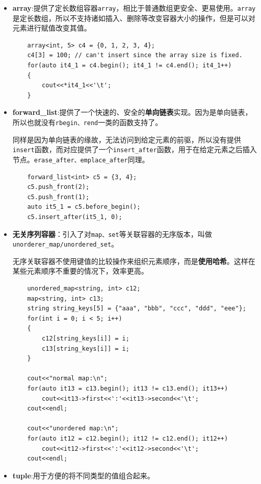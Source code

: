 \documentclass[UTF8,a4paper,12pt]{ctexbook} %
\begin{document}
					\begin{itemize}
						\item \textbf{array}:提供了定长数组容器\verb|array|，相比于普通数组更安全、更易使用。\verb|array|是定长数组，所以不支持诸如插入、删除等改变容器大小的操作，但是可以对元素进行赋值改变其值。
						\begin{lstlisting}
	array<int, 5> c4 = {0, 1, 2, 3, 4};
	c4[3] = 100; // can't insert since the array size is fixed.
	for(auto it4_1 = c4.begin(); it4_1 != c4.end(); it4_1++)
	{
		cout<<*it4_1<<'\t';
	}
						\end{lstlisting}
						
						\item \textbf{forward\_list}:提供了一个快速的、安全的\textbf{单向链表}实现。因为是单向链表，所以也就没有\verb|rbegin、rend|一类的函数支持了。
			
						同样是因为单向链表的缘故，无法访问到给定元素的前驱，所以没有提供\verb|insert|函数，而对应提供了一个\verb|insert_after|函数，用于在给定元素之后插入节点。\verb|erase_after、emplace_after|同理。
						\begin{lstlisting}
	forward_list<int> c5 = {3, 4};
	c5.push_front(2);
	c5.push_front(1);
	auto it5_1 = c5.before_begin();
	c5.insert_after(it5_1, 0);
						\end{lstlisting}
						
						\item \textbf{无关序列容器}：引入了对\verb|map、set|等关联容器的无序版本，叫做\verb|unorderer_map/unordered_set|。
						
						无序关联容器不使用键值的比较操作来组织元素顺序，而是\textbf{使用哈希}。这样在某些元素顺序不重要的情况下，效率更高。
						\begin{lstlisting}
	unordered_map<string, int> c12;
	map<string, int> c13;
	string string_keys[5] = {"aaa", "bbb", "ccc", "ddd", "eee"};
	for(int i = 0; i < 5; i++)
	{
		c12[string_keys[i]] = i;
		c13[string_keys[i]] = i;
	}
							
	cout<<"normal map:\n";
	for(auto it13 = c13.begin(); it13 != c13.end(); it13++)
		cout<<it13->first<<':'<<it13->second<<'\t';
	cout<<endl;
							
	cout<<"unordered map:\n";
	for(auto it12 = c12.begin(); it12 != c12.end(); it12++)
		cout<<it12->first<<':'<<it12->second<<'\t';
	cout<<endl;
						\end{lstlisting}
						
						\item \textbf{tuple}:用于方便的将不同类型的值组合起来。
						

\end{itemize}
\end{document}
